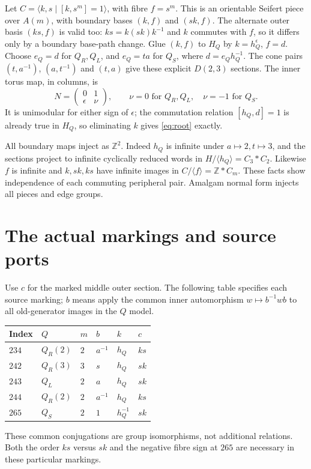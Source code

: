 \documentclass[11pt]{article}
\begin{document}
Let $C=\langle k,s\mid[k,s^m]=1\rangle$, with fibre $f=s^m$.
This is an orientable Seifert piece over $A(m)$, with boundary bases
$(k,f)$ and $(sk,f)$. The alternate outer basis $(ks,f)$ is valid too:
$ks=k(sk)k^{-1}$ and $k$ commutes with $f$, so it differs only by a
boundary base-path change. Glue $(k,f)$ to $H_Q$ by $k=h_Q^\epsilon$,
$f=d$. Choose $e_Q=d$ for $Q_R,Q_L$, and $e_Q=ta$ for $Q_S$, where
$d=e_Qh_Q^{-1}$. The cone pairs $(t,a^{-1})$, $(a,t^{-1})$ and $(t,a)$
give these explicit $D(2,3)$ sections. The inner torus map, in columns,
is
\[
 N=\begin{pmatrix}0&1\\ \epsilon&\nu\end{pmatrix},\qquad
 \nu=0\text{ for }Q_R,Q_L,\quad \nu=-1\text{ for }Q_S.
\]
It is unimodular for either sign of $\epsilon$; the commutation relation
$[h_Q,d]=1$ is already true in $H_Q$, so eliminating $k$ gives
\eqref{eq:root} exactly.

All boundary maps inject as $\mathbb Z^2$. Indeed $h_Q$ is infinite
under $a\mapsto2,t\mapsto3$, and the sections project to infinite
cyclically reduced words in $H/\langle h_Q\rangle=C_3*C_2$.
Likewise $f$ is infinite and $k,sk,ks$ have infinite images in
$C/\langle f\rangle=\mathbb Z*C_m$. These facts show independence of
each commuting peripheral pair. Amalgam normal form injects all pieces
and edge groups.

\section{The actual markings and source ports}

Use $c$ for the marked middle outer section. The following table specifies
each source marking; $b$ means apply the common inner automorphism
$w\mapsto b^{-1}wb$ to all old-generator images in the $Q$ model.
\begin{center}
\begin{tabular}{llllll}
\toprule
Index & $Q$ & $m$ & $b$ & $k$ & $c$\\
\midrule
$234$ & $Q_R(2)$ & $2$ & $a^{-1}$ & $h_Q$ & $ks$\\
$242$ & $Q_R(3)$ & $3$ & $s$ & $h_Q$ & $sk$\\
$243$ & $Q_L$ & $2$ & $a$ & $h_Q$ & $sk$\\
$244$ & $Q_R(2)$ & $2$ & $a^{-1}$ & $h_Q$ & $ks$\\
$265$ & $Q_S$ & $2$ & $1$ & $h_Q^{-1}$ & $sk$\\
\bottomrule
\end{tabular}
\end{center}
These common conjugations are group isomorphisms, not additional
relations. Both the order $ks$ versus $sk$ and the negative fibre sign
at $265$ are necessary in these particular markings.
\end{document}
